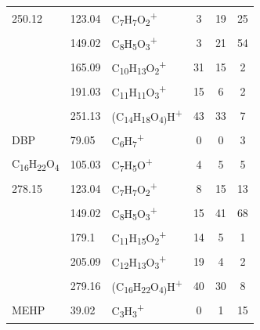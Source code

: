 {\begin{longtable}[c]{lllccc}
250.12          & 123.04               & C\textsubscript{7}H\textsubscript{7}O\textsubscript{2}\textsuperscript{+}      & 3            & 19           & 25           \\
          & 149.02               & C\textsubscript{8}H\textsubscript{5}O\textsubscript{3}\textsuperscript{+}      & 3            & 21           & 54           \\
          & 165.09               & C\textsubscript{10}H\textsubscript{13}O\textsubscript{2}\textsuperscript{+}    & 31           & 15           & 2            \\
          & 191.03               & C\textsubscript{11}H\textsubscript{11}O\textsubscript{3}\textsuperscript{+}    & 15           & 6            & 2            \\
          & 251.13               & (C\textsubscript{14}H\textsubscript{18}O\textsubscript{4)}H\textsuperscript{+} & 43           & 33           & 7            \\
\hline
DBP                                                      & 79.05  & C\textsubscript{6}H\textsubscript{7}\textsuperscript{+}                        & 0  & 0  & 3  \\
C\textsubscript{16}H\textsubscript{22}O\textsubscript{4} & 105.03 & C\textsubscript{7}H\textsubscript{5}O\textsuperscript{+}                       & 4  & 5  & 5  \\
278.15                                                   & 123.04 & C\textsubscript{7}H\textsubscript{7}O\textsubscript{2}\textsuperscript{+}      & 8  & 15 & 13 \\
                                                         & 149.02 & C\textsubscript{8}H\textsubscript{5}O\textsubscript{3}\textsuperscript{+}      & 15 & 41 & 68 \\
                                                         & 179.1  & C\textsubscript{11}H\textsubscript{15}O\textsubscript{2}\textsuperscript{+}    & 14 & 5  & 1  \\
                                                         & 205.09 & C\textsubscript{12}H\textsubscript{13}O\textsubscript{3}\textsuperscript{+}    & 19 & 4  & 2  \\
                                                         & 279.16 & (C\textsubscript{16}H\textsubscript{22}O\textsubscript{4)}H\textsuperscript{+} & 40 & 30 & 8 \\
\hline
MEHP                                                     & 39.02  & C\textsubscript{3}H\textsubscript{3}\textsuperscript{+}                   & 0  & 1  & 15 \\

\end{longtable}}
